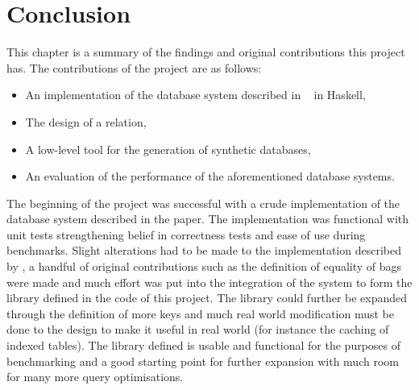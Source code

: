 \chapter{Conclusion}
\begin{comment}
Conclusions and Future Work
The project's conclusions should summarise the key insights that have been gained, be they positive or negative. For example, "The use of overloading in C++ provides a very elegant mechanism for transparent parallelisation of sequential programs", or "The overheads of linear-time n-body algorithms makes them computationally less efficient than O(n log n) algorithms for systems with less than 100000 particles". Avoid tedious personal reflections like "I learned a lot about C++ programming...". It is common to finish the report by listing ways in which the project can be taken further. This might, for example, be a plan for doing the project better if you could do a re-run, turning the project deliverables into a more polished end product, or extending the project into a programme for an MPhil or PhD.
\end{comment}
This chapter is a summary of the findings and original contributions this
project has. The contributions of the project are as follows:
\begin{itemize}
    \item An implementation of the database system described in
        \relalg{}~\cite{RelationalAlgebraByWayOfAdjunctions} in Haskell,
    \item The design of a  relation,
    \item A low-level tool for the generation of synthetic databases,
    \item An evaluation of the performance of the aforementioned database
        systems.
\end{itemize}

The beginning of the project was successful with a crude implementation of the
database system described in the paper. The implementation was functional with
unit tests strengthening belief in correctness tests and ease of use during
benchmarks. Slight alterations had to be made to the implementation described by
\relalg{}, a handful of original contributions such as the definition of
equality
of bags were made and much effort was put into the integration of the system to form the
library defined in the code of this project. The library could further be
expanded through the definition of more keys and much real world modification
must be done to the design to make it useful in real world (for instance the
caching of indexed tables). The library defined is usable and functional for the
purposes of benchmarking and a good starting point for further expansion with
much room for many more query optimisations.

